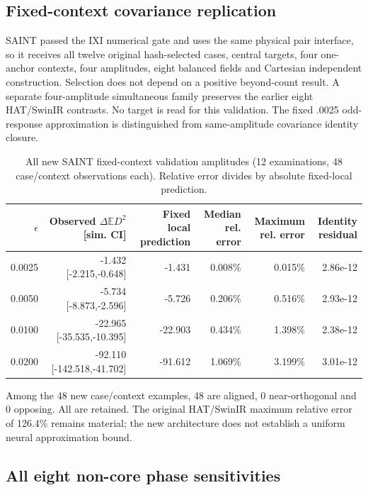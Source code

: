 \subsection{Fixed-context covariance replication}

SAINT passed the IXI numerical gate and uses the same physical pair interface, so it receives all twelve original hash-selected cases, central targets, four one-anchor contexts, four amplitudes, eight balanced fields and Cartesian independent construction. Selection does not depend on a positive beyond-count result. A separate four-amplitude simultaneous family preserves the earlier eight HAT/SwinIR contrasts. No target is read for this validation. The fixed .0025 odd-response approximation is distinguished from same-amplitude covariance identity closure.

\begin{table}[t]\centering\scriptsize\caption{All new SAINT fixed-context validation amplitudes (12 examinations, 48 case/context observations each). Relative error divides by absolute fixed-local prediction.}\begin{tabular}{rrrrrr}\toprule $\epsilon$ & Observed $\Delta\mathbb ED^2$ [sim. CI] & Fixed local prediction & Median rel. error & Maximum rel. error & Identity residual\\\midrule

0.0025 & -1.432 [-2.215,-0.648] & -1.431 & 0.008\% & 0.015\% & 2.86e-12 \\

0.0050 & -5.734 [-8.873,-2.596] & -5.726 & 0.206\% & 0.516\% & 2.93e-12 \\

0.0100 & -22.965 [-35.535,-10.395] & -22.903 & 0.434\% & 1.398\% & 2.38e-12 \\

0.0200 & -92.110 [-142.518,-41.702] & -91.612 & 1.069\% & 3.199\% & 3.01e-12 \\

\bottomrule\end{tabular}\end{table}

Among the 48 new case/context examples, 48 are aligned, 0 near-orthogonal and 0 opposing. All are retained. The original HAT/SwinIR maximum relative error of 126.4\% remains material; the new architecture does not establish a uniform neural approximation bound.

\subsection{All eight non-core phase sensitivities}

